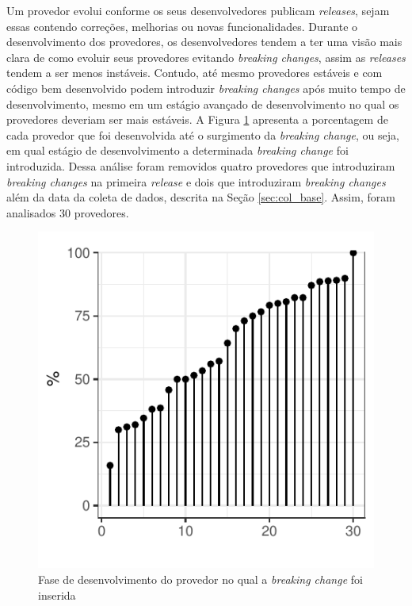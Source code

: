 Um provedor evolui conforme os seus desenvolvedores publicam \textit{releases}, sejam essas contendo correções, melhorias ou novas funcionalidades. Durante o desenvolvimento dos provedores, os desenvolvedores tendem a ter uma visão mais clara de como evoluir seus provedores evitando \textit{breaking changes}, assim as \textit{releases} tendem a ser menos instáveis. Contudo, até mesmo provedores estáveis e com código bem desenvolvido podem introduzir \textit{breaking changes} após muito tempo de desenvolvimento, mesmo em um estágio avançado de desenvolvimento no qual os provedores deveriam ser mais estáveis. A Figura \ref{fig:providers_releases_bc} apresenta a porcentagem de cada provedor que foi desenvolvida até o surgimento da \textit{breaking change}, ou seja, em qual estágio de desenvolvimento a determinada \textit{breaking change} foi introduzida. Dessa análise foram removidos quatro provedores que introduziram \textit{breaking changes} na primeira \textit{release} e dois que introduziram \textit{breaking changes} além da data da coleta de dados, descrita na Seção \ref{sec:col_base}. Assim, foram analisados 30 provedores. 

\begin{figure}
	\centering
	\includegraphics{figuras/providers_releases_bc.pdf}
	\caption{Fase de desenvolvimento do provedor no qual a \textit{breaking change} foi inserida}
	\label{fig:providers_releases_bc}
\end{figure}{}

